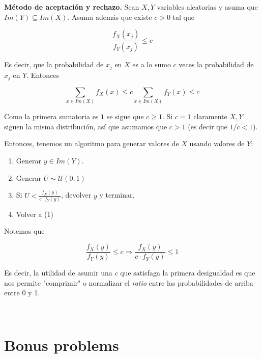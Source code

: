 \documentclass[a4paper, 12pt]{article}
\begin{document}
\begin{myframe}
\textbf{Método de aceptación y rechazo.} Sean $X, Y$ variables aleatorias y asuma que $Im(Y)
\subseteq Im(X)$. Asuma además que existe $c > 0$ tal que

\begin{equation*}
  \frac{ f_X(x_j) }{f_Y(x_j)} \leq c
\end{equation*}

Es decir, que la probabilidad de $x_j$ en $X$ es a lo sumo $c$ veces la
probabilidad de $x_j$ en $Y$. Entonces 

\begin{equation*}
  \sum_{x \in Im(X)} f_X(x) \leq c \sum_{x \in Im(X)} f_Y(x) \leq c
\end{equation*}

Como la primera sumatoria es $1$ se sigue que $c \geq 1$. Si $c = 1$ claramente
$X, Y$ siguen la misma distribución, así que asumamos que $c > 1$ (es decir que 
$1 / c < 1$).

Entonces, 
tenemos un algoritmo para generar valores de $X$ usando valores de $Y$:

\begin{enumerate}
  \item Generar $y \in Im(Y)$.
  \item Generar $U \sim \mathcal{U}(0, 1)$
  \item Si $U < \frac{f_X(y)}{c \cdot f_Y(y)}$, devolver $y$ y terminar.
  \item Volver a (1)
\end{enumerate}

Notemos que 

\begin{equation*}
  \frac{f_X(y)}{f_Y(y)} \leq c \Rightarrow  \frac{f_X(y)}{c \cdot f_Y(y)} \leq 1
\end{equation*}

Es decir, la utilidad de asumir una $c$ que satisfaga la primera desigualdad es
que nos permite "comprimir" o normalizar el \textit{ratio} entre las
probabilidades de arriba entre 0 y 1. 
\end{myframe}

~
\pagebreak 






\pagebreak 

\section{Bonus problems}
\end{document}
